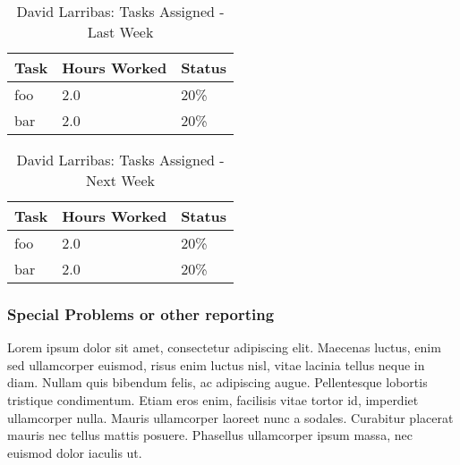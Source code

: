 \documentclass[12pt,article,compsoc]{IEEEtran}
\begin{document}
	\begin{table}[ht]
	\renewcommand{\arraystretch}{1.3}
		\caption{David Larribas: Tasks Assigned - Last Week}
		
		\label{Summary of David Larribas' activities: last week}
		
		\centering
		\begin{tabular}{p{5.5cm}|p{1cm}|p{1cm}}
		\hline
		\bfseries 	Task		 		& \bfseries Hours Worked	& \bfseries Status	\\
		\hline\hline
					foo					& 2.0						& 20\%				\\	%
					bar					& 2.0						& 20\%				\\	
		\hline
		\end{tabular}
	\end{table}

	\begin{table}[ht]
	\renewcommand{\arraystretch}{1.3}
		\caption{David Larribas: Tasks Assigned - Next Week}
		
		\label{Summary of David Larribas' activites: this week}
		
		\centering
		\begin{tabular}{p{5.5cm}|p{1cm}|p{1cm}}
		\hline

		\bfseries 	Task		 		& \bfseries Hours Worked	& \bfseries Status	\\
		\hline\hline
					foo					& 2.0						& 20\%				\\	%
					bar					& 2.0						& 20\%				\\	
		\hline
		\end{tabular}
	\end{table}

	\subsubsection*{Special Problems or other reporting}
	Lorem ipsum dolor sit amet, consectetur adipiscing elit. Maecenas luctus, enim sed ullamcorper euismod, risus enim luctus nisl, vitae lacinia tellus neque in diam. Nullam quis bibendum felis, ac adipiscing augue. Pellentesque lobortis tristique condimentum. Etiam eros enim, facilisis vitae tortor id, imperdiet ullamcorper nulla. Mauris ullamcorper laoreet nunc a sodales. Curabitur placerat mauris nec tellus mattis posuere. Phasellus ullamcorper ipsum massa, nec euismod dolor iaculis ut.
	\clearpage
\end{document}
